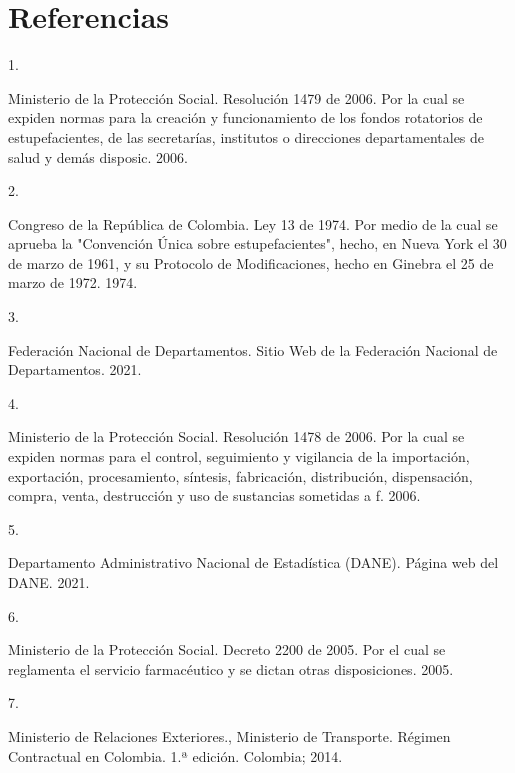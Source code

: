 \documentclass[
]{book}
\newlength{\cslhangindent}
\newlength{\csllabelwidth}
\newlength{\cslentryspacingunit} %
\newenvironment{CSLReferences}[2] %
 {%
  \setlength{\parindent}{0pt}
  \ifodd #1
  \let\oldpar\par
  \def\par{\hangindent=\cslhangindent\oldpar}
  \fi
  \setlength{\parskip}{#2\cslentryspacingunit}
 }%
 {}
\newcommand{\CSLLeftMargin}[1]{\parbox[t]{\csllabelwidth}{#1}}
\newcommand{\CSLRightInline}[1]{\parbox[t]{\linewidth - \csllabelwidth}{#1}\break}
\begin{document}
\hypertarget{referencias}{%
\chapter*{Referencias}\label{referencias}}

\hypertarget{refs}{}
\begin{CSLReferences}{0}{0}
\leavevmode{}%
\CSLLeftMargin{1. }
\CSLRightInline{Ministerio de la Protección Social. {Resoluci{ó}n 1479 de 2006. Por la cual se expiden normas para la creaci{ó}n y funcionamiento de los fondos rotatorios de estupefacientes, de las secretar{í}as, institutos o direcciones departamentales de salud y dem{á}s disposic}. 2006.}

\leavevmode{}%
\CSLLeftMargin{2. }
\CSLRightInline{Congreso de la República de Colombia. {Ley 13 de 1974. Por medio de la cual se aprueba la "Convenci{ó}n {Ú}nica sobre estupefacientes", hecho, en Nueva York el 30 de marzo de 1961, y su Protocolo de Modificaciones, hecho en Ginebra el 25 de marzo de 1972}. 1974.}

\leavevmode{}%
\CSLLeftMargin{3. }
\CSLRightInline{Federación Nacional de Departamentos. {Sitio Web de la Federaci{ó}n Nacional de Departamentos}. 2021.}

\leavevmode{}%
\CSLLeftMargin{4. }
\CSLRightInline{Ministerio de la Protección Social. {Resoluci{ó}n 1478 de 2006. Por la cual se expiden normas para el control, seguimiento y vigilancia de la importaci{ó}n, exportaci{ó}n, procesamiento, s{í}ntesis, fabricaci{ó}n, distribuci{ó}n, dispensaci{ó}n, compra, venta, destrucci{ó}n y uso de sustancias sometidas a f}. 2006.}

\leavevmode{}%
\CSLLeftMargin{5. }
\CSLRightInline{Departamento Administrativo Nacional de Estadística (DANE). {P{á}gina web del DANE}. 2021.}

\leavevmode{}%
\CSLLeftMargin{6. }
\CSLRightInline{Ministerio de la Protección Social. {Decreto 2200 de 2005. Por el cual se reglamenta el servicio farmac{é}utico y se dictan otras disposiciones.} 2005.}

\leavevmode{}%
\CSLLeftMargin{7. }
\CSLRightInline{Ministerio de Relaciones Exteriores., Ministerio de Transporte. {R{é}gimen Contractual en Colombia}. 1.ª edición. Colombia; 2014.}


\end{CSLReferences}
\end{document}

